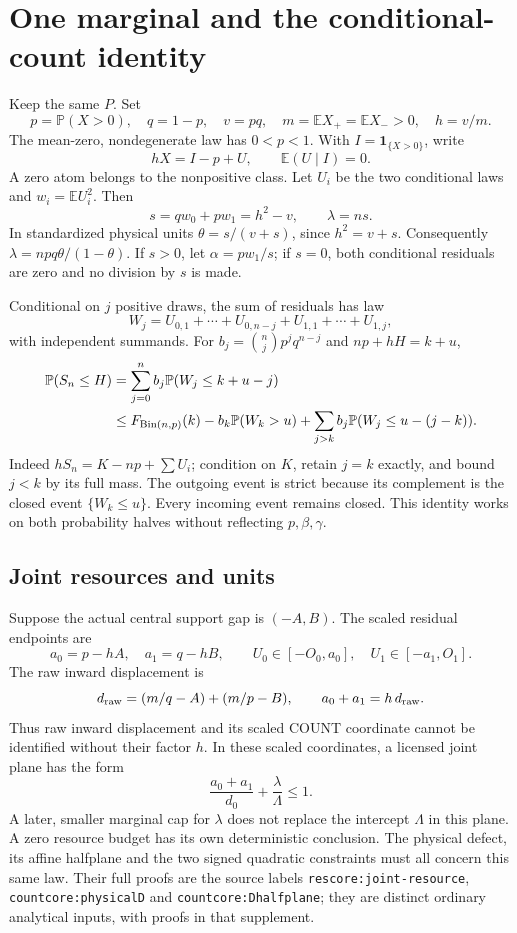\documentclass[11pt,a4paper]{article}
\newcommand{\E}{\mathbb E}
\newcommand{\Pp}{\mathbb P}
\begin{document}
\section{One marginal and the conditional-count identity}
Keep the same \(P\). Set
\[
 p=\Pp(X>0),\quad q=1-p,\quad v=pq,\quad
 m=\E X_+=\E X_->0,\quad h=v/m.
\]
The mean-zero, nondegenerate law has \(0<p<1\). With
\(I=\mathbf1_{\{X>0\}}\), write
\[
 hX=I-p+U,\qquad \E(U\mid I)=0.
\]
A zero atom belongs to the nonpositive class. Let \(U_i\) be the two
conditional laws and \(w_i=\E U_i^2\). Then
\[
 s=qw_0+pw_1=h^2-v,\qquad \lambda=ns.
\]
In standardized physical units $\theta=s/(v+s)$, since $h^2=v+s$.
Consequently $\lambda=npq\theta/(1-\theta)$.
If \(s>0\), let \(\alpha=pw_1/s\); if \(s=0\), both conditional residuals
are zero and no division by \(s\) is made.

Conditional on \(j\) positive draws, the sum of residuals has law
\[
 W_j=U_{0,1}+\cdots+U_{0,n-j}+U_{1,1}+\cdots+U_{1,j},
\]
with independent summands. For \(b_j=\binom njp^jq^{n-j}\) and
\(np+hH=k+u\),
\begin{align}
 \Pp(S_n\le H)
 &=\sum_{j=0}^n b_j\Pp(W_j\le k+u-j)\notag\\
 &\le F_{\mathrm{Bin}(n,p)}(k)-b_k\Pp(W_k>u)
       +\sum_{j>k}b_j\Pp(W_j\le u-(j-k)).       \label{eq:count}
\end{align}
Indeed \(hS_n=K-np+\sum U_i\); condition on \(K\), retain \(j=k\)
exactly, and bound \(j<k\) by its full mass. The outgoing event is strict
because its complement is the closed event \(\{W_k\le u\}\).
Every incoming event remains closed. This identity works on both
probability halves without reflecting \(p,\beta,\gamma\).

\subsection*{Joint resources and units}
Suppose the actual central support gap is \((-A,B)\). The scaled residual
endpoints are
\[
 a_0=p-hA,\quad a_1=q-hB,\qquad
 U_0\in[-O_0,a_0],\quad U_1\in[-a_1,O_1].
\]
The raw inward displacement is
\[
 d_{\rm raw}=(m/q-A)+(m/p-B),\qquad a_0+a_1=h\,d_{\rm raw}.
\]
Thus raw inward displacement and its scaled COUNT coordinate cannot be
identified without their factor \(h\). In these scaled coordinates, a
licensed joint plane has the form
\[
 \frac{a_0+a_1}{d_0}+\frac{\lambda}{\Lambda}\le1.
\]
A later, smaller marginal cap for \(\lambda\) does not replace the
intercept \(\Lambda\) in this plane. A zero resource budget has its own
deterministic conclusion. The physical defect, its affine halfplane and
the two signed quadratic constraints must all concern this same law.
Their full proofs are the source labels
\texttt{rescore:joint-resource}, \texttt{countcore:physicalD} and
\texttt{countcore:Dhalfplane}; they are distinct ordinary analytical inputs,
with proofs in that supplement.
\end{document}
